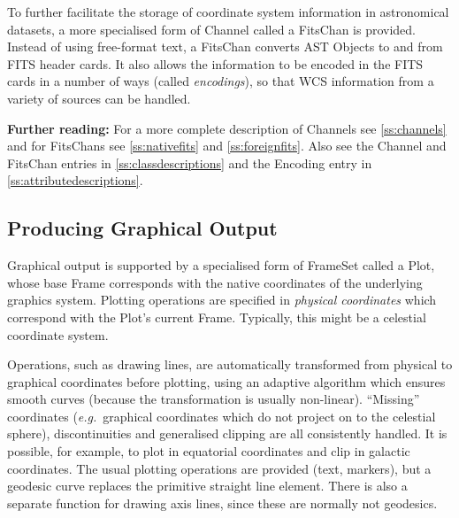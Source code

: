 \documentclass[twoside,11pt]{article}
\newcommand{\appref}[1]{Appendix~\ref{#1}}
\newcommand{\secref}[1]{\S\ref{#1}}
\renewcommand{\appref}[1]{\ref{#1}}
\renewcommand{\secref}[1]{\ref{#1}}
\begin{document}
{To further facilitate the storage of coordinate system information in
astronomical datasets, a more specialised form of Channel called a
FitsChan is provided. Instead of using free-format text, a FitsChan
converts AST Objects to and from FITS header cards. It also allows the
information to be encoded in the FITS cards in a number of ways
(called {\em{encodings}}), so that WCS information from a variety of
sources can be handled.

{\bf{Further reading:}} For a more complete description of Channels
see \secref{ss:channels} and for FitsChans see \secref{ss:nativefits}
and \secref{ss:foreignfits}. Also see the Channel and FitsChan entries
in \appref{ss:classdescriptions} and the Encoding entry in
\appref{ss:attributedescriptions}.

\subsection{Producing Graphical Output}

Graphical output is supported by a specialised form of FrameSet called
a Plot, whose base Frame corresponds with the native coordinates of
the underlying graphics system.  Plotting operations are specified in
{\em{physical coordinates}} which correspond with the Plot's current
Frame. Typically, this might be a celestial coordinate system.

Operations, such as drawing lines, are automatically transformed from
physical to graphical coordinates before plotting, using an adaptive
algorithm which ensures smooth curves (because the transformation is
usually non-linear).  ``Missing'' coordinates ({\em{e.g.}}\ graphical
coordinates which do not project on to the celestial sphere),
discontinuities and generalised clipping are all consistently handled.
It is possible, for example, to plot in equatorial coordinates and
clip in galactic coordinates.  The usual plotting operations are
provided (text, markers), but a geodesic curve replaces the primitive
straight line element.  There is also a separate function for drawing
axis lines, since these are normally not geodesics.

}
\end{document}
